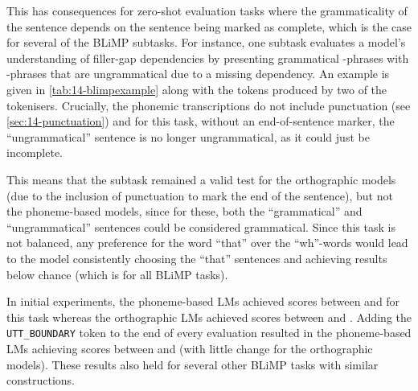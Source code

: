 This has consequences for zero-shot evaluation tasks where the grammaticality of the sentence depends on the sentence being marked as complete, which is the case for several of the BLiMP subtasks. For instance, one subtask evaluates a model's understanding of filler-gap dependencies by presenting grammatical -phrases with -phrases that are ungrammatical due to a missing dependency. An example is given in \cref{tab:14-blimpexample} along with the tokens produced by two of the tokenisers. Crucially, the phonemic transcriptions do not include punctuation (see \cref{sec:14-punctuation}) and for this task, without an end-of-sentence marker, the ``ungrammatical'' sentence is no longer ungrammatical, as it could just be incomplete.

This means that the subtask remained a valid test for the orthographic models (due to the inclusion of punctuation to mark the end of the sentence), but not the phoneme-based models, since for these, both the ``grammatical'' and ``ungrammatical'' sentences could be considered grammatical. Since this task is not balanced, any preference for the word ``that'' over the ``wh''-words would lead to the model consistently choosing the ``that'' sentences and achieving results below chance (which is  for all BLiMP tasks).


In initial experiments, the phoneme-based LMs achieved scores between  and  for this task whereas the orthographic LMs achieved scores between  and . Adding the \texttt{UTT\_BOUNDARY} token to the end of every evaluation resulted in the phoneme-based LMs achieving scores between  and  (with little change for the orthographic models). These results also held for several other BLiMP tasks with similar constructions. 

